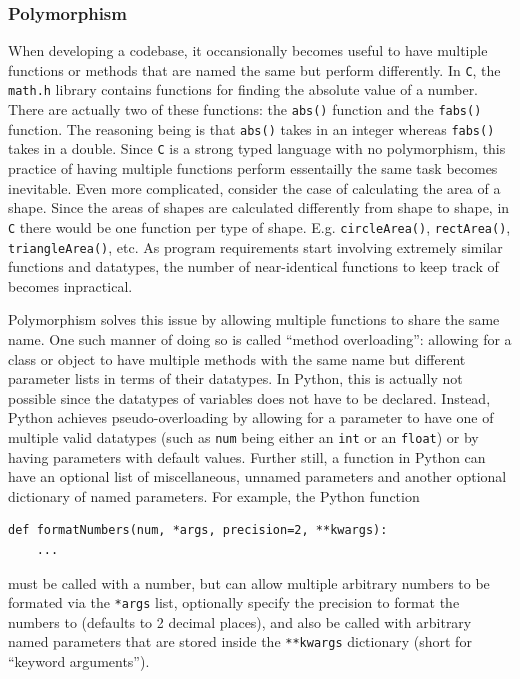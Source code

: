 \documentclass[11pt]{article}
\begin{document}
\subsubsection{Polymorphism}

When developing a codebase, it occansionally becomes useful to have multiple functions or methods that are named the same but perform differently. In \texttt{C}, the \texttt{math.h} library contains functions for finding the absolute value of a number. There are actually two of these functions: the \texttt{abs()} function and the \texttt{fabs()} function. The reasoning being is that \texttt{abs()} takes in an integer whereas \texttt{fabs()} takes in a double. Since \texttt{C} is a strong typed language with no polymorphism, this practice of having multiple functions perform essentailly the same task becomes inevitable. Even more complicated, consider the case of calculating the area of a shape. Since the areas of shapes are calculated differently from shape to shape, in \texttt{C} there would be one function per type of shape. E.g. \texttt{circleArea()}, \texttt{rectArea()}, \texttt{triangleArea()}, etc. As program requirements start involving extremely similar functions and datatypes, the number of near-identical functions to keep track of becomes inpractical.

Polymorphism solves this issue by allowing multiple functions to share the same name. One such manner of doing so is called ``method overloading'': allowing for a class or object to have multiple methods with the same name but different parameter lists in terms of their datatypes. In Python, this is actually not possible since the datatypes of variables does not have to be declared. Instead, Python achieves pseudo-overloading by allowing for a parameter to have one of multiple valid datatypes (such as \texttt{num} being either an \texttt{int} or an \texttt{float}) or by having parameters with default values. Further still, a function in Python can have an optional list of miscellaneous, unnamed parameters and another optional dictionary of named parameters. For example, the Python function

\begin{verbatim}
def formatNumbers(num, *args, precision=2, **kwargs):
    ...
\end{verbatim}

\noindent
must be called with a number, but can allow multiple arbitrary numbers to be formated via the \texttt{*args} list, optionally specify the precision to format the numbers to (defaults to 2 decimal places), and also be called with arbitrary named parameters that are stored inside the \texttt{**kwargs} dictionary (short for ``keyword arguments'').
\end{document}
